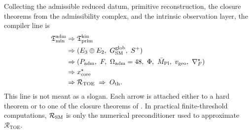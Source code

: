 Collecting the admissible reduced datum, primitive reconstruction, the closure theorems from the
admissibility complex, and the intrinsic observation layer, the compiler line is
\begin{equation}
\label{eq:closed-compiler-chain}
\begin{aligned}
\mathfrak T_{\mathrm{min}}^{\mathrm{adm}}
&\Rightarrow
\mathfrak T_{\mathrm{prim}}^{\mathrm{kin}}\\
&\Rightarrow
(E_3\oplus E_2,\ G_{\mathrm{SM}}^{\mathrm{glob}},\ S^+)\\
&\Rightarrow
(P_{\mathrm{adm}},\ F,\ \Omega_{\mathrm{adm}}=48,\ \Phi,\ \bar M_{\mathrm{Pl}},\ v_{\mathrm{geo}},\ \nabla_F^\star)\\
&\Rightarrow
x_{\mathrm{core}}^\star\\
&\Rightarrow
\mathcal R_{\mathrm{TOE}}
\;\Rightarrow\;
O_{\mathrm{th}}.
\end{aligned}
\end{equation}
This line is not meant as a slogan. Each arrow is attached either to a hard theorem or to one of
the closure theorems of . In practical finite-threshold computations,
$\mathcal R_{\mathrm{SM}}$ is only the numerical preconditioner used to approximate
$\mathcal R_{\mathrm{TOE}}$.

